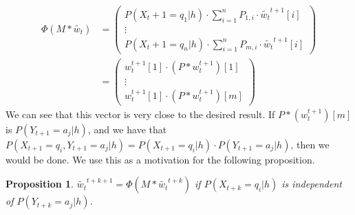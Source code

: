\documentclass{article}
\newtheorem{prop}{Proposition}
\theoremstyle{definition}
\begin{document}
\begin{align*}
\Phi(M*\widetilde{w_t})&=
\left ( 
\begin{matrix}
P(X_t+1=q_1|h)\cdot \sum\limits_{i=1}^{n} P_{1,i}\cdot \widetilde{w_t}^{t+1}[i] \\
\vdots \\
P(X_t+1=q_n|h)\cdot \sum\limits_{i=1}^{n} P_{m,i}\cdot \widetilde{w_t}^{t+1}[i]
\end{matrix}
\right ) \\
&=
\left ( 
\begin{matrix}
w_t^{t+1}[1]\cdot (P*w_t^{t+1})[1] \\
\vdots \\
w_t^{t+1}[1]\cdot (P*w_t^{t+1})[m]
\end{matrix} 
\right )
\end{align*}
We can see that this vector is very close to the desired result. If $P*(w_t^{t+1})[m] $ is $P(Y_{t+1}=a_j|h)$, and we have that $P(X_{t+1}=q_i,Y_{t+1}=a_j|h)=P(X_{t+1}=q_i|h)\cdot P(Y_{t+1}=a_j|h)$, then we would be done. We use this as a motivation for the following proposition.
\begin{prop} $\widetilde{w_t}^{t+k+1}=\Phi(M*\widetilde{w_t}^{t+k})$ if $P(X_{t+k}=q_i|h)$ is independent of $P(Y_{t+k}=a_j|h)$. \end{prop}
\end{document}
